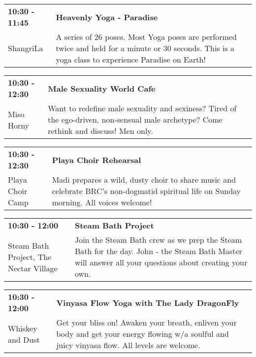 \begin{tabular}{ p{1in} p{2.2in} }
    \textbf{10:30 - 11:45} & \textbf{Heavenly Yoga - Paradise} \\
    ShangriLa \newline  & A series of 26 poses. Most Yoga poses are performed twice and held for a minute or 30 seconds. This is a yoga class to experience Paradise on Earth! \\
    \hline 
\end{tabular}
    
\begin{tabular}{ p{1in} p{2.2in} }
    \textbf{10:30 - 12:30} & \textbf{Male Sexuality World Cafe} \\
    Miso Horny \newline  & Want to redefine male sexuality and sexiness? Tired of the ego-driven, non-sensual male archetype? Come rethink and discuss! Men only. \\
    \hline 
\end{tabular}
    
\begin{tabular}{ p{1in} p{2.2in} }
    \textbf{10:30 - 12:30} & \textbf{Playa Choir Rehearsal} \\
    Playa Choir Camp \newline  & Madi prepares a wild, dusty choir to share music and celebrate BRC's non-dogmatid spiritual life on Sunday morning. All voices welcome! \\
    \hline 
\end{tabular}
    
\begin{tabular}{ p{1in} p{2.2in} }
    \textbf{10:30 - 12:00} & \textbf{Steam Bath Project} \\
    Steam Bath Project, The \newline Nectar Village & Join the Steam Bath crew as we prep the Steam Bath for the day. John - the Steam Bath Master will answer all your questions about creating your own. \\
    \hline 
\end{tabular}
    
\begin{tabular}{ p{1in} p{2.2in} }
    \textbf{10:30 - 12:00} & \textbf{Vinyasa Flow Yoga with The Lady DragonFly} \\
    Whiskey and Dust \newline  & Get your bliss on! Awaken your breath, enliven your body and get your energy flowing w/a soulful and juicy vinyasa flow. All levels are welcome. \\
    \hline 
\end{tabular}
    
